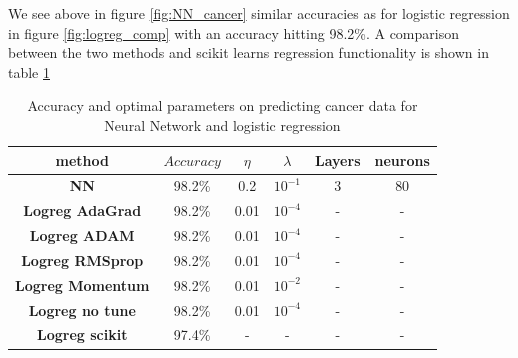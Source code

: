 \documentclass[11pt]{article}
\begin{document}
We see above in figure \ref{fig:NN_cancer} similar accuracies as for logistic regression in figure \ref{fig:logreg_comp} with an accuracy hitting 98.2\%. A comparison between the two methods and scikit learns regression functionality is shown in table \ref{tab:cancer_comp}
\begin{table}[H]
    \centering
    \caption{Accuracy and optimal parameters on predicting cancer data for Neural Network and logistic regression}
    \label{tab:cancer_comp}
    \begin{tabular}{|c|c|c|c|c|c|}
        \hline
        method                   & $Accuracy$ & $\eta$ & $\lambda$ & Layers & neurons \\
        \hline
        \textbf{NN}              & 98.2\%     & 0.2    & $10^{-1}$ & 3      & 80      \\\hline
        \textbf{Logreg AdaGrad}  & 98.2\%     & 0.01   & $10^{-4}$ & -      & -       \\\hline
        \textbf{Logreg ADAM}     & 98.2\%     & 0.01   & $10^{-4}$ & -      & -       \\\hline
        \textbf{Logreg RMSprop}  & 98.2\%     & 0.01   & $10^{-4}$ & -      & -       \\\hline
        \textbf{Logreg Momentum} & 98.2\%     & 0.01   & $10^{-2}$ & -      & -       \\\hline
        \textbf{Logreg no tune}  & 98.2\%     & 0.01   & $10^{-4}$ & -      & -       \\\hline
        \textbf{Logreg scikit}   & 97.4\%     & -      & -         & -      & -       \\\hline
    \end{tabular}
\end{table}
\end{document}
